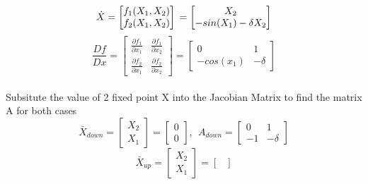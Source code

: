 \documentclass{article}
\begin{document}
\begin{itemize}
    \begin{equation}
      \dot{X} =  
      \begin{bmatrix} 
        f_{1}(X_{1}, X_{2})\\ f_{2}(X_{1}, X_{2}) 
      \end{bmatrix}\\
      =
      \begin{bmatrix} 
        X_{2}\\ -sin(X_{1}) -\delta X_{2} 
      \end{bmatrix} 
    \end{equation}
    \begin{equation}
      \frac{Df}{Dx} =
            \begin{bmatrix}
              \frac{\partial f_{1}}{\partial x_{1}}  & \frac{\partial f_{1}}{\partial x_{2}} \\ 
              \frac{\partial f_{2}}{\partial x_{1}}  & \frac{\partial f_{2}}{\partial x_{2}} 
            \end{bmatrix}
            =
            \begin{bmatrix}
               0 &  1 \\ 
              -cos(x_{1}) & -\delta
            \end{bmatrix}  
    \end{equation}  
  \\Subsitute the value of 2 fixed point X into the Jacobian Matrix to find the matrix A for both cases
    \begin{equation}
      \bar{X}_{down} =
      \begin{bmatrix} 
        X_{2}\\ 
        X_{1}
      \end{bmatrix} 
      =  
      \begin{bmatrix} 
        0\\ 0  
      \end{bmatrix}
      ,~~A_{down} =  
      \begin{bmatrix}
        0 &  1 \\ 
       -1 & -\delta
     \end{bmatrix}  
    \end{equation}
    \begin{equation}
      \bar{X}_{up} =
      \begin{bmatrix} 
        X_{2}\\ 
        X_{1}
      \end{bmatrix} 
      =  
      \begin{bmatrix} 

\end{bmatrix}
\end{equation}
\end{itemize}
\end{document}
